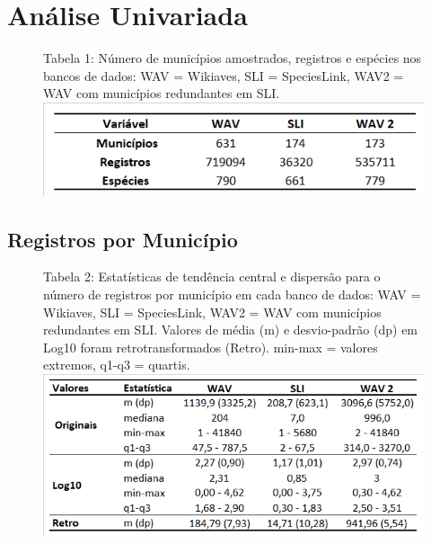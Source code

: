 \section{Análise Univariada}

\texto

\begin{figure}[h!]
\centering
{\scriptsize Tabela 1: Número de municípios amostrados, registros e espécies nos bancos de dados: WAV = Wikiaves, SLI = SpeciesLink, WAV2 = WAV com municípios redundantes em SLI.}
\includegraphics{Tabelas/1.png}
\end{figure}

\texto

\texto

\newpage

\subsection{Registros por Município}

\begin{figure}[h!]
\centering
{\scriptsize Tabela 2: Estatísticas de tendência central e dispersão para o número de registros por município em cada banco de dados: WAV = Wikiaves, SLI = SpeciesLink, WAV2 = WAV com municípios redundantes em SLI. Valores de média (m) e desvio-padrão (dp) em Log10 foram retrotransformados (Retro). min-max = valores extremos, q1-q3 = quartis.}
\includegraphics{Tabelas/2.png}
\end{figure}

\texto

